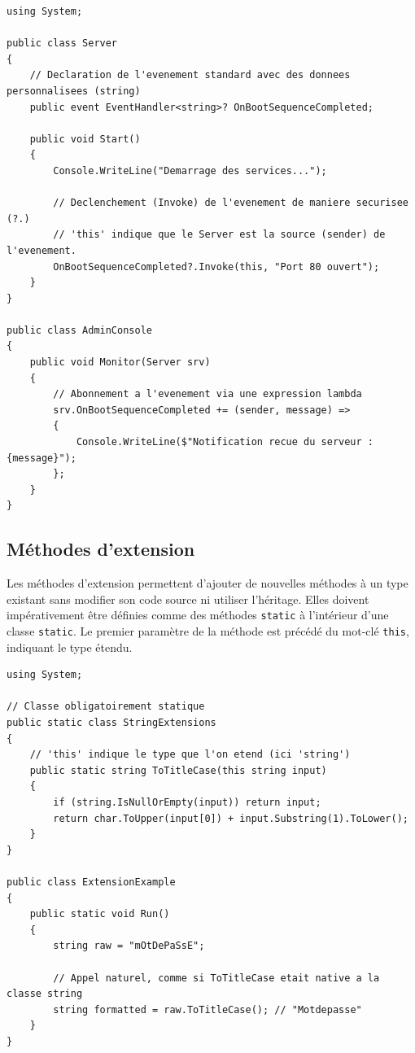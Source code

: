 \begin{lstlisting}[language={[Sharp]C}]
using System;

public class Server
{
    // Declaration de l'evenement standard avec des donnees personnalisees (string)
    public event EventHandler<string>? OnBootSequenceCompleted;

    public void Start()
    {
        Console.WriteLine("Demarrage des services...");
        
        // Declenchement (Invoke) de l'evenement de maniere securisee (?.)
        // 'this' indique que le Server est la source (sender) de l'evenement.
        OnBootSequenceCompleted?.Invoke(this, "Port 80 ouvert");
    }
}

public class AdminConsole
{
    public void Monitor(Server srv)
    {
        // Abonnement a l'evenement via une expression lambda
        srv.OnBootSequenceCompleted += (sender, message) => 
        {
            Console.WriteLine($"Notification recue du serveur : {message}");
        };
    }
}
\end{lstlisting}

\subsection{Méthodes d'extension}

Les méthodes d'extension permettent d'ajouter de nouvelles méthodes à un type existant sans modifier son code source ni utiliser l'héritage. Elles doivent impérativement être définies comme des méthodes \texttt{static} à l'intérieur d'une classe \texttt{static}. Le premier paramètre de la méthode est précédé du mot-clé \texttt{this}, indiquant le type étendu.

\begin{lstlisting}[language={[Sharp]C}]
using System;

// Classe obligatoirement statique
public static class StringExtensions
{
    // 'this' indique le type que l'on etend (ici 'string')
    public static string ToTitleCase(this string input)
    {
        if (string.IsNullOrEmpty(input)) return input;
        return char.ToUpper(input[0]) + input.Substring(1).ToLower();
    }
}

public class ExtensionExample
{
    public static void Run()
    {
        string raw = "mOtDePaSsE";
        
        // Appel naturel, comme si ToTitleCase etait native a la classe string
        string formatted = raw.ToTitleCase(); // "Motdepasse"
    }
}
\end{lstlisting}

